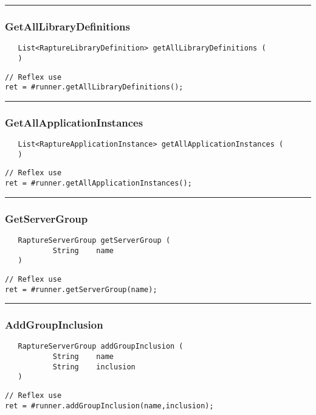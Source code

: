 \rule{15cm}{2pt}
\subsubsection{GetAllLibraryDefinitions}
\label{Api:GetAllLibraryDefinitions}
\begin{verbatim}
   List<RaptureLibraryDefinition> getAllLibraryDefinitions (
   )
\end{verbatim}
\begin{lstlisting}[language=reflex]
// Reflex use
ret = #runner.getAllLibraryDefinitions();
\end{lstlisting}



\rule{15cm}{2pt}
\subsubsection{GetAllApplicationInstances}
\label{Api:GetAllApplicationInstances}
\begin{verbatim}
   List<RaptureApplicationInstance> getAllApplicationInstances (
   )
\end{verbatim}
\begin{lstlisting}[language=reflex]
// Reflex use
ret = #runner.getAllApplicationInstances();
\end{lstlisting}



\rule{15cm}{2pt}
\subsubsection{GetServerGroup}
\label{Api:GetServerGroup}
\begin{verbatim}
   RaptureServerGroup getServerGroup (
           String    name
   )
\end{verbatim}
\begin{lstlisting}[language=reflex]
// Reflex use
ret = #runner.getServerGroup(name);
\end{lstlisting}



\rule{15cm}{2pt}
\subsubsection{AddGroupInclusion}
\label{Api:AddGroupInclusion}
\begin{verbatim}
   RaptureServerGroup addGroupInclusion (
           String    name
           String    inclusion
   )
\end{verbatim}
\begin{lstlisting}[language=reflex]
// Reflex use
ret = #runner.addGroupInclusion(name,inclusion);
\end{lstlisting}



